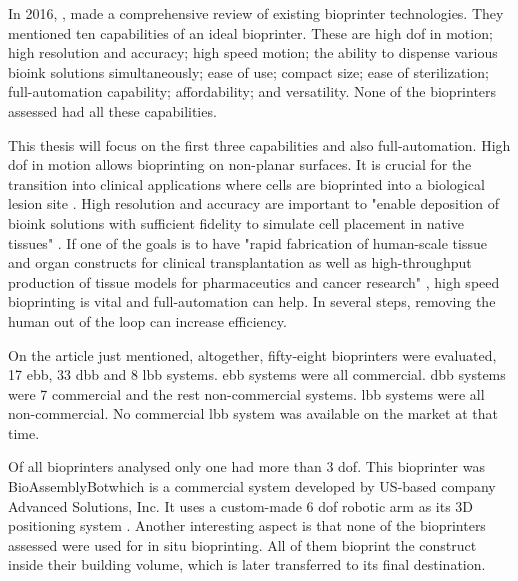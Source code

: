 In 2016, \citeauthor{Ozbolat2017_evaluation_bioprinter_tech}, made a comprehensive review of existing bioprinter technologies. They mentioned ten capabilities of an ideal bioprinter. These are high \gls{dof} in motion; high resolution and accuracy; high speed motion; the ability to dispense various bioink solutions simultaneously; ease of use; compact size; ease of sterilization; full-automation capability; affordability; and versatility. None of the bioprinters assessed had all these capabilities.

This thesis will focus on the first three capabilities and also full-automation. High \gls{dof} in motion allows bioprinting on non-planar surfaces. It is crucial for the transition into clinical applications where cells are bioprinted into a biological lesion site \cite{Ozbolat2017_evaluation_bioprinter_tech}. High resolution and accuracy are important to "enable deposition of bioink solutions with sufficient fidelity to simulate cell placement in native tissues" \cite{Ozbolat2017_evaluation_bioprinter_tech}. If one of the goals is to have "rapid fabrication of human-scale tissue and organ constructs for clinical transplantation as well as high-throughput production of tissue models for pharmaceutics and cancer research" \cite{Ozbolat2017_evaluation_bioprinter_tech}, high speed bioprinting is vital and full-automation can help. In several steps, removing the human out of the loop can increase efficiency.

On the article just mentioned, altogether, fifty-eight bioprinters were evaluated, 17 \gls{ebb}, 33 \gls{dbb} and 8 \gls{lbb} systems. \gls{ebb} systems were all commercial. \gls{dbb} systems were 7 commercial and the rest non-commercial systems. \gls{lbb} systems were all non-commercial. No commercial \gls{lbb} system was available on the market at that time.

Of all bioprinters analysed only one had more than 3 \gls{dof}. This bioprinter was BioAssemblyBot\textregistered which is a commercial system developed by US-based company Advanced Solutions, Inc. It uses a custom-made 6 \gls{dof} robotic arm as its 3D positioning system \cite{Advanced2020_bioassemblybot}. Another interesting aspect is that none of the bioprinters assessed were used for in situ bioprinting. All of them bioprint the construct inside their building volume, which is later transferred to its final destination.

